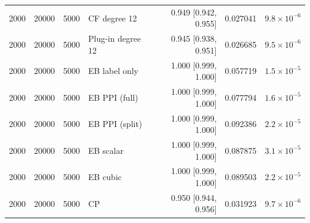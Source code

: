 {\begin{longtable}{rrrlrrr}
2000 & 20000 & 5000 & CF degree 12 & 0.949 [0.942, 0.955] & 0.027041 & $9.8\times 10^{-6}$ \\
2000 & 20000 & 5000 & Plug-in degree 12 & 0.945 [0.938, 0.951] & 0.026685 & $9.5\times 10^{-6}$ \\
2000 & 20000 & 5000 & EB label only & 1.000 [0.999, 1.000] & 0.057719 & $1.5\times 10^{-5}$ \\
2000 & 20000 & 5000 & EB PPI (full) & 1.000 [0.999, 1.000] & 0.077794 & $1.6\times 10^{-5}$ \\
2000 & 20000 & 5000 & EB PPI (split) & 1.000 [0.999, 1.000] & 0.092386 & $2.2\times 10^{-5}$ \\
2000 & 20000 & 5000 & EB scalar & 1.000 [0.999, 1.000] & 0.087875 & $3.1\times 10^{-5}$ \\
2000 & 20000 & 5000 & EB cubic & 1.000 [0.999, 1.000] & 0.089503 & $2.2\times 10^{-5}$ \\
2000 & 20000 & 5000 & CP & 0.950 [0.944, 0.956] & 0.031923 & $9.7\times 10^{-6}$ \\
\end{longtable}}
